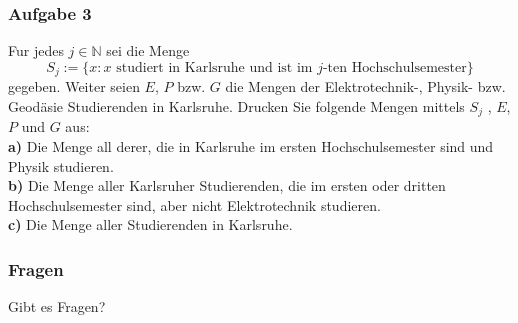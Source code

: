 \documentclass{beamer}
\begin{document}
\begin{frame}
    \frametitle{Aufgabe 3}
    Fur jedes $j \in \mathbb{N}$ sei die Menge
    \[
    S_j := \{ x : x \text{ studiert in Karlsruhe und ist im $j$-ten Hochschulsemester} \}
    \]
    gegeben. Weiter seien $E$, $P$ bzw. $G$ die Mengen der Elektrotechnik-, Physik- bzw. Geodäsie Studierenden
    in Karlsruhe. Drucken Sie folgende Mengen mittels $S_j$
    , $E$, $P$ und $G$ aus:\\
    \textbf{a)} Die Menge all derer, die in Karlsruhe im ersten Hochschulsemester sind und Physik
    studieren.\\
    \textbf{b)} Die Menge aller Karlsruher Studierenden, die im ersten oder dritten Hochschulsemester
    sind, aber nicht Elektrotechnik studieren.\\
    \textbf{c)} Die Menge aller Studierenden in Karlsruhe.\\
\end{frame}
 
\begin{frame}
    \frametitle{Fragen}
    
    \huge Gibt es Fragen?
    
\end{frame}
 
\end{document}
